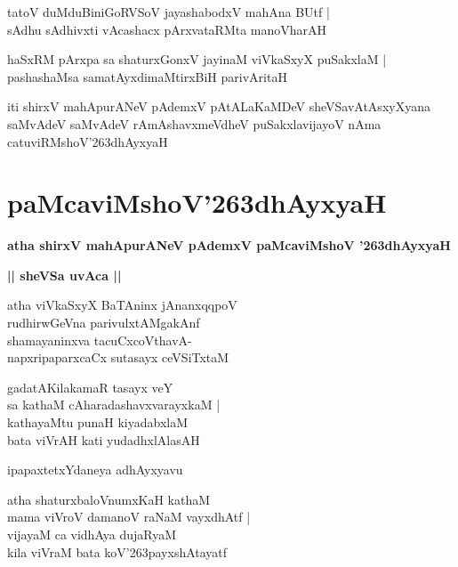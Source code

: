 \documentclass[twoside,12pt,openright]{book}
\def\S{\char'263}
\newcounter{shloka}[chapter]
\def\uvaca#1{\centerline{{\large\textbf{#1}}}}
\begin{document}
\begin{shloka}%
tatoV duMduBiniGoRVSoV jayashabodxV mahAna BUtf |\\
sAdhu sAdhivxti vAcashacx pArxvataRMta manoVharAH 
\end{shloka}

\begin{shloka}%
haSxRM pArxpa sa shaturxGonxV jayinaM viVkaSxyX puSakxlaM |\\
pashashaMsa samatAyxdimaMtirxBiH parivAritaH 
\end{shloka}

\begin{center}
iti shirxV mahApurANeV pAdemxV pAtALaKaMDeV sheVSavAtAsxyXyana saMvAdeV 
saMvAdeV rAmAshavxmeVdheV puSakxlavijayoV nAma catuviRMshoV\S dhAyxyaH
\end{center}

\chapter{paMcaviMshoV\S dhAyxyaH}

\begin{center}
{\LARGE\bfseries atha shirxV mahApurANeV pAdemxV paMcaviMshoV \S dhAyxyaH}
\end{center}

\uvaca{|| sheVSa uvAca ||}

\begin{shloka}%
atha viVkaSxyX BaTAninx jAnanxqqpoV \\
rudhirwGeVna parivulxtAMgakAnf \\
shamayaninxva tacuCxcoVthavA-\\
napxripaparxcaCx sutasayx ceVSiTxtaM
\end{shloka}

\begin{shloka}%
gadatAKilakamaR tasayx veY \\
sa kathaM cAharadashavxvarayxkaM |\\
kathayaMtu punaH kiyadabxlaM \\
bata viVrAH kati yudadhxlAlasAH
\end{shloka}

\begin{center}
ipapaxtetxYdaneya adhAyxyavu
\end{center}

\begin{shloka}%
atha shaturxbaloVnumxKaH kathaM \\
mama viVroV damanoV raNaM vayxdhAtf |\\
vijayaM ca vidhAya dujaRyaM \\
kila viVraM bata koV\S payxshAtayatf
\end{shloka}
\end{document}
